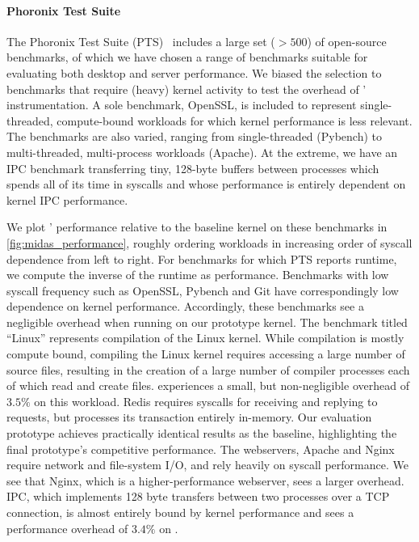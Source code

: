 \documentclass[letterpaper,twocolumn,10pt]{article}
\begin{document}
\paragraph{Phoronix Test Suite}
The Phoronix Test Suite (PTS)~\cite{pts} includes a large set ($>500$) of 
open-source benchmarks, of which we have chosen a range of benchmarks 
suitable for evaluating both desktop and server performance.
We biased the selection to benchmarks that require (heavy) kernel activity to
test the overhead of \midas' instrumentation.
A sole benchmark, OpenSSL, is included to represent single-threaded, 
compute-bound workloads for which kernel performance is less relevant.
The benchmarks are also varied, ranging from single-threaded (Pybench) to 
multi-threaded, multi-process workloads (Apache).
At the extreme, we have an IPC benchmark transferring tiny, 128-byte 
buffers between processes which spends all of its time in syscalls
and whose performance is entirely dependent on kernel IPC performance.

We plot \midas' performance relative to the baseline kernel on
these benchmarks in \autoref{fig:midas_performance}, roughly ordering 
workloads in increasing order of syscall dependence from left to right.
For benchmarks for which PTS reports runtime, we compute the inverse 
of the runtime as performance.
Benchmarks with low syscall frequency such as OpenSSL, 
Pybench and Git have correspondingly low dependence on kernel performance.
Accordingly, these benchmarks see a negligible overhead when running 
on our prototype kernel.
The benchmark titled ``Linux'' represents compilation of the Linux kernel.
While compilation is mostly compute bound, compiling the Linux kernel requires 
accessing a large number of source files, resulting in the creation 
of a large number of compiler processes each of which read and create 
files. 
\midas experiences a small, but non-negligible overhead of $3.5\%$ on this workload.
Redis requires syscalls for receiving and replying to requests, but 
processes its transaction entirely in-memory. 
Our evaluation prototype achieves practically identical results as the baseline, 
highlighting the final prototype's competitive performance.
The webservers, Apache and Nginx require network and file-system I/O, 
and rely heavily on syscall performance. 
We see that Nginx, which is a higher-performance webserver, sees a larger
overhead.
IPC, which implements 128 byte transfers between 
two processes over a TCP connection, is almost entirely bound by kernel 
performance and sees a performance overhead of $3.4\%$ on \midas.
\end{document}
